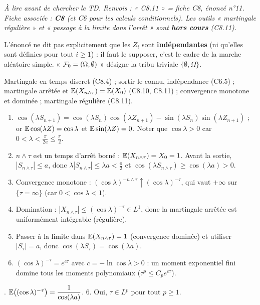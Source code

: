 \documentclass[11pt,a4paper]{article}
\begin{document}

\textit{À lire avant de chercher le TD. Renvois : « C8.11 » = fiche C8, énoncé n°11. Fiche associée : \textbf{C8} (et C6 pour les
calculs conditionnels). Les outils « martingale régulière » et « passage à la limite dans l'arrêt » sont \textbf{hors cours} (C8.11).}

\begin{exo}
\begin{alerte}
L'énoncé ne dit pas explicitement que les $Z_i$ sont \textbf{indépendantes} (ni qu'elles sont définies pour tout $i\ge1$) : il faut le supposer,
c'est le cadre de la marche aléatoire simple. « $\mathcal{F}_0=(\Omega,\emptyset)$ » désigne la tribu triviale $\{\emptyset,\Omega\}$.
\end{alerte}
\outils Martingale en temps discret (C8.4) ; sortir le connu, indépendance (C6.5) ; martingale arrêtée et $\mathbb{E}(X_{n\wedge\tau})=\mathbb{E}(X_0)$ (C8.10, C8.11) ;
convergence monotone et dominée ; martingale régulière (C8.11).

\meth
\begin{enumerate}
  \item $\cos(\lambda S_{n+1})=\cos(\lambda S_n)\cos(\lambda Z_{n+1})-\sin(\lambda S_n)\sin(\lambda Z_{n+1})$ ; or $\mathbb{E}\cos(\lambda Z)=\cos\lambda$ et
  $\mathbb{E}\sin(\lambda Z)=0$. Noter que $\cos\lambda>0$ car $0<\lambda<\frac\pi{2a}\le\frac\pi2$.
  \item $n\wedge\tau$ est un temps d'arrêt borné : $\mathbb{E}(X_{n\wedge\tau})=X_0=1$. Avant la sortie, $|S_{n\wedge\tau}|\le a$, donc
  $\lambda|S_{n\wedge\tau}|\le\lambda a<\frac\pi2$ et $\cos(\lambda S_{n\wedge\tau})\ge\cos(\lambda a)>0$.
  \item Convergence monotone : $(\cos\lambda)^{-n\wedge\tau}\uparrow(\cos\lambda)^{-\tau}$, qui vaut $+\infty$ sur $\{\tau=\infty\}$ (car $0<\cos\lambda<1$).
  \item Domination : $|X_{n\wedge\tau}|\le(\cos\lambda)^{-\tau}\in L^1$, donc la martingale arrêtée est uniformément intégrable (régulière).
  \item Passer à la limite dans $\mathbb{E}(X_{n\wedge\tau})=1$ (convergence dominée) et utiliser $|S_\tau|=a$, donc $\cos(\lambda S_\tau)=\cos(\lambda a)$.
  \item $(\cos\lambda)^{-\tau}=e^{c\tau}$ avec $c=-\ln\cos\lambda>0$ : un moment exponentiel fini domine tous les moments polynomiaux
  ($\tau^p\le C_pe^{c\tau}$).
\end{enumerate}

. $\mathbb{E}\bigl((\cos\lambda)^{-\tau}\bigr)=\dfrac1{\cos(\lambda a)}$. 6. Oui, $\tau\in L^p$ pour tout $p\ge1$.
\end{exo}
\end{document}
